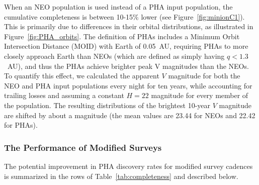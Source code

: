 When an NEO population is used instead of a PHA input population, the cumulative completeness is between 10-15\% lower
(see Figure~\ref{fig:minionC1}). This is primarily due to differences in their orbital distributions, as illustrated in Figure~\ref{fig:PHA_orbits}. The definition of PHAs includes a Minimum Orbit Intersection Distance (MOID) with Earth of 0.05~AU, requiring PHAs to more closely approach Earth than NEOs (which are defined as simply having $q<1.3$~AU), and thus the PHAs achieve brighter peak V magnitudes than the NEOs. To quantify this effect, we calculated the apparent $V$ magnitude for both the NEO and PHA input populations every night for ten years, while accounting for trailing losses and assuming a constant $H=22$ magnitude for every member of the population. The resulting distributions of the
brightest 10-year $V$ magnitude are shifted by about a magnitude (the mean values are 23.44 for NEOs and 22.42 for PHAs).


\subsubsection{The Performance of Modified Surveys}

The potential improvement in PHA discovery rates for modified survey cadences is
summarized in the rows of Table~\ref{tab:completeness} and described below.

